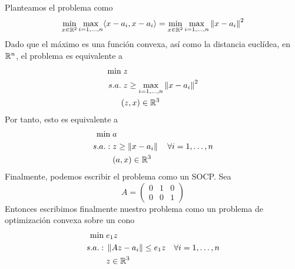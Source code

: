 \documentclass[twoside]{article}
\begin{document}
\begin{solucion}
Planteamos el problema como
\begin{align*}
\min_{x\in\mathbb{R}^2} \max_{i=1,\dotsc,n}\langle x-a_i,x-a_i\rangle = \min_{x\in\mathbb{R}^2} \max_{i=1,\dotsc,n}\left\lVert x-a_i\right\rVert^2
\end{align*}
Dado que el máximo es una función convexa, así como la distancia euclídea, en $\mathbb{R}^n$, el problema es equivalente a 
\begin{align*}
\min &\; z\\
s.a.& \;z\geq \max_{i=1,\dotsc,n}\left\lVert x-a_i\right\rVert^2\\
&(z,x)\in \mathbb{R}^3
\end{align*}
Por tanto, esto es equivalente a 
\begin{align*}
\min &\; a\\
s.a.:& \;z\geq \left\lVert x-a_i\right\rVert \quad \forall i = 1,\dotsc,n\\
&\;(a,x)\in \mathbb{R}^3
\end{align*}
Finalmente, podemos escribir el problema como un SOCP. Sea 
$$
A=\begin{pmatrix}
0 & 1 & 0\\
0 & 0 & 1
\end{pmatrix}
$$
Entonces escribimos finalmente nuestro problema como un problema de optimización convexa sobre un cono
\begin{align*}
\min &\; e_1 z \\
s.a.:& \; \left\lVert Az-a_i\right\rVert\leq e_1 z \quad \forall i = 1,\dotsc,n\\
&\;z\in \mathbb{R}^3
\end{align*}
\end{solucion}
\end{document}
